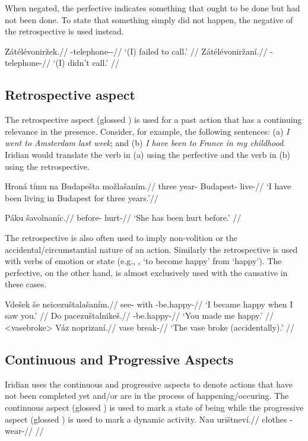 When negated, the perfective indicates something that ought to be done but had not been done. To state that something simply did not happen, the negative of the retrospective is used instead.

\begin{multicols}{2}
\pex
\a\begingl
\gla Zátélévoniržek.//
\glb \Neg{}-telephone-\Av{}-\Pf{}//
\glft `(I) failed to call.' //
\endgl
\a\begingl
\gla Zátélévoniržaní.//
\glb \Neg{}-telephone-//
\glft `(I) didn't call.' //
\endgl
\xe
\end{multicols}

\subsection{Retrospective aspect}
\par The retrospective aspect (glossed ) is used for a past action that has a continuing relevance in the presence. Consider, for example, the following sentences: (a) \textit{I went to Amsterdam last week}; and (b) \textit{I have been to France in my childhood}. Iridian would translate the verb in (a) using the perfective and the verb in (b) using the retrospective.

\begingl
\gla Hroná tímu na Budapešta možlašaním.//
\glb three year-\Ins{} \Loc{} Budapest-\Pat{} live-//
\glft `I have been living in Budapest for three years.'//
\endgl
\xe

\begingl
\gla Páku šavolnaníc.//
\glb before-\Ins{} hurt-//
\glft `She has been hurt before.' //
\endgl
\xe

\par The retrospective is also often used to imply non-volition or the  accidental/circumstantial nature of an action. Similarly the retrospective is used with verbs of emotion or state (e.g., , ‘to become happy’ from  ‘happy’). The perfective, on the other hand, is almost exclusively used with the causative in these cases.

\pex
\a	\begingl
\gla Vdešek še neicezuštalašaním.//
\glb see- with -be.happy-//
\glft `I became happy when I saw you.' //
\endgl
\a	\begingl
\gla Do pacezuštalnikeš.//
\glb {} \Caus{}-be.happy-//
\glft `You made me happy.' //
\endgl
\xe
\pex<vasebroke>
\begingl
\gla Váz noprizaní.//
\glb vase break-//
\glft `The vase broke (accidentally).' //
\endgl
\xe

\subsection{Continuous and Progressive Aspects}
Iridian uses the continuous and progressive aspects to denote actions that have not been completed yet and/or are in the process of happening/occuring. The continuous aspect (glossed ) is used to mark a state of being while the progressive aspect (glossed ) is used to mark a dynamic activity.
\pex
\begingl
\gla Nau urištneví.//
\glb clothes \Refl{}-wear-//
\glft {} //
\endgl
\xe

